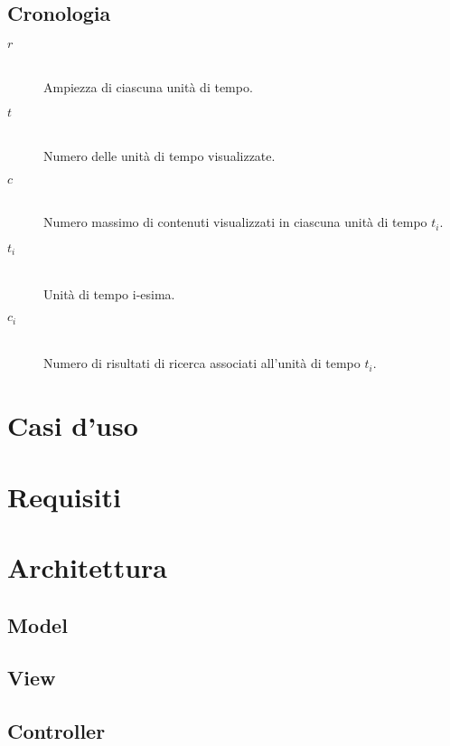 \subsection*{Cronologia}
\begin{description}
	\item[$r$] \hfill \\
	Ampiezza di ciascuna unità di tempo.
	\item[$t$] \hfill \\
	Numero delle unità di tempo visualizzate.
	\item[$c$] \hfill \\
	Numero massimo di contenuti visualizzati in ciascuna unità di tempo $t_i$.
	\item[$t_i$] \hfill \\
	Unità di tempo i-esima.
	\item[$c_i$] \hfill \\
	Numero di risultati di ricerca associati all'unità di tempo $t_i$.
\end{description}

\section*{Casi d'uso}

\section*{Requisiti}

\section*{Architettura}

\subsection*{Model}

\subsection*{View}

\subsection*{Controller}
